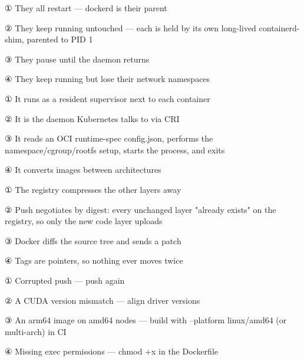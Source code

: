 
\begin{tbboptions}
  \item ① They all restart — dockerd is their parent
  \item ② They keep running untouched — each is held by its own long-lived containerd-shim, parented to PID 1
  \item ③ They pause until the daemon returns
  \item ④ They keep running but lose their network namespaces
\end{tbboptions}


\begin{tbboptions}
  \item ① It runs as a resident supervisor next to each container
  \item ② It is the daemon Kubernetes talks to via CRI
  \item ③ It reads an OCI runtime-spec config.json, performs the namespace/cgroup/rootfs setup, starts the process, and exits
  \item ④ It converts images between architectures
\end{tbboptions}


\begin{tbboptions}
  \item ① The registry compresses the other layers away
  \item ② Push negotiates by digest: every unchanged layer "already exists" on the registry, so only the new code layer uploads
  \item ③ Docker diffs the source tree and sends a patch
  \item ④ Tags are pointers, so nothing ever moves twice
\end{tbboptions}


\begin{tbboptions}
  \item ① Corrupted push — push again
  \item ② A CUDA version mismatch — align driver versions
  \item ③ An arm64 image on amd64 nodes — build with --platform linux/amd64 (or multi-arch) in CI
  \item ④ Missing exec permissions — chmod +x in the Dockerfile
\end{tbboptions}

